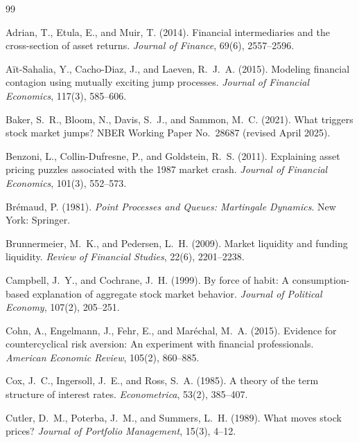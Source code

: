 \documentclass[11pt,a4paper]{article}
\theoremstyle{remark}
\begin{document}
\begin{thebibliography}{99}
\small

Adrian, T., Etula, E., and Muir, T. (2014). Financial intermediaries and the cross-section
of asset returns. \emph{Journal of Finance}, 69(6), 2557--2596.

A\"it-Sahalia, Y., Cacho-Diaz, J., and Laeven, R.~J.~A. (2015). Modeling financial
contagion using mutually exciting jump processes. \emph{Journal of Financial Economics},
117(3), 585--606.

Baker, S.~R., Bloom, N., Davis, S.~J., and Sammon, M.~C. (2021). What triggers stock market
jumps? NBER Working Paper No.~28687 (revised April 2025).

Benzoni, L., Collin-Dufresne, P., and Goldstein, R.~S. (2011). Explaining asset pricing
puzzles associated with the 1987 market crash. \emph{Journal of Financial Economics},
101(3), 552--573.

Br\'emaud, P. (1981). \emph{Point Processes and Queues: Martingale Dynamics}. New York:
Springer.

Brunnermeier, M.~K., and Pedersen, L.~H. (2009). Market liquidity and funding liquidity.
\emph{Review of Financial Studies}, 22(6), 2201--2238.

Campbell, J.~Y., and Cochrane, J.~H. (1999). By force of habit: A consumption-based
explanation of aggregate stock market behavior. \emph{Journal of Political Economy}, 107(2),
205--251.

Cohn, A., Engelmann, J., Fehr, E., and Mar\'echal, M.~A. (2015). Evidence for
countercyclical risk aversion: An experiment with financial professionals. \emph{American
Economic Review}, 105(2), 860--885.

Cox, J.~C., Ingersoll, J.~E., and Ross, S.~A. (1985). A theory of the term structure of
interest rates. \emph{Econometrica}, 53(2), 385--407.

Cutler, D.~M., Poterba, J.~M., and Summers, L.~H. (1989). What moves stock prices?
\emph{Journal of Portfolio Management}, 15(3), 4--12.


\end{thebibliography}
\end{document}
